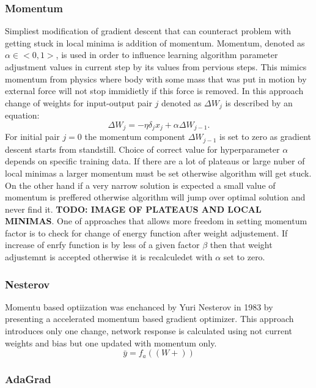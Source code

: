\subsubsection{Momentum}
Simpliest modification of gradient descent that can counteract problem with getting stuck in 
local minima is addition of momentum. 
Momentum, denoted as $\alpha \in <0,1>$, is used in order to influence learning algorithm 
parameter adjustment values in current step by its values from pervious steps.
This mimics momentum from physics where body with some mass that was put in motion by external
force will not stop immidietly if this force is removed.
In this approach change of weights for input-output pair $j$ denoted as $\Delta W_{j}$ is 
described by an equation:
\begin{equation}
	\Delta W_{j} = -\eta \delta_{j} x_{j} + \alpha \Delta W_{j-1}.
\end{equation}
For initial pair $j=0$ the momentum component $\Delta W_{j-1}$ is set to zero as gradient 
descent starts from standstill.
Choice of correct value for hyperparameter $\alpha$ depends on specific training data.
If there are a lot of plateaus or large nuber of local minimas a larger momentum must be set
otherwise algorithm will get stuck. On the other hand if a very narrow solution is expected
a small value of momentum is preffered otherwise algorithm will jump over optimal solution and
never find it. \textbf{TODO: IMAGE OF PLATEAUS AND LOCAL MINIMAS}.
One of approaches that allows more freedom in setting momentum factor is to check for change of
energy function after weight adjustement. If increase of enrfy function is by less
of a given factor $\beta$ then that weight adjustemnt is accepted otherwise it is recalculedet
with $\alpha$ set to zero. 

\subsubsection{Nesterov}
Momentu based optiization was enchanced by Yuri Nesterov in 1983 by presenting a accelerated
momentum based gradient optimizer. This approach introduces only one change, network response
is calculated using not current weights and bias but one updated with momentum only.
\begin{equation}
	\bar{y} = f_{a}((W+))	
\end{equation}


\subsubsection{AdaGrad}

